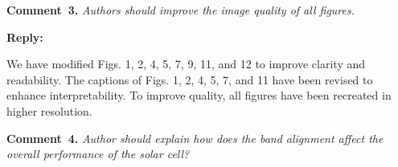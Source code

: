 \documentclass[a4paper,fleqn]{cas-sc}
\begin{document}
%
%
%


\vspace{1cm}
\noindent
\textcolor[rgb]{0.00,0.50,1.00}{\textbf{Comment~3.}}
\emph{Authors should improve the image quality of all figures.}


\noindent
\textcolor[rgb]{0.51,0.00,0.00}{\textbf{Reply:}}

We have modified Figs. 1, 2, 4, 5, 7, 9, 11, and 12 to improve clarity and readability.
The captions of Figs. 1, 2, 4, 5, 7, and 11 have been revised to enhance interpretability.
To improve quality, all figures have been recreated in higher resolution.

\vspace{1cm}
\noindent
\textcolor[rgb]{0.00,0.50,1.00}{\textbf{Comment~4.}}
\emph{Author should explain how does the band alignment affect the overall performance of the solar cell?}

\end{document}
